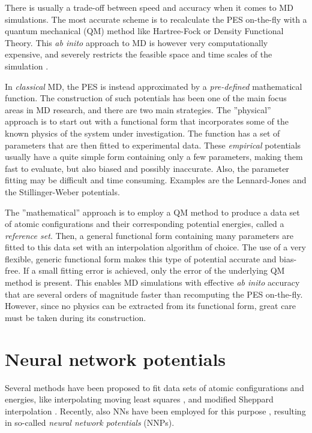\documentclass[twoside,english]{uiofysmaster}
\begin{document}
There is usually a trade-off between speed and accuracy when it comes to MD simulations. 
The most accurate scheme is to recalculate the PES on-the-fly with a quantum mechanical (QM) method like 
Hartree-Fock or Density Functional Theory. 
This \textit{ab inito} approach to MD is however very computationally expensive, 
and severely restricts the feasible space and time scales of the simulation \cite{Sherrill10}.   

In \textit{classical} MD, the PES is instead approximated by a \textit{pre-defined} mathematical function. 
The construction of such potentials has been one of the main focus areas in MD research, and there 
are two main strategies. The ''physical'' approach is to start out with a functional form 
that incorporates some of the known physics of the system under investigation. 
The function has a set of parameters that are then fitted to experimental data. 
These \textit{empirical} potentials usually have a quite simple form containing only 
a few parameters, making them fast to evaluate, but also biased and possibly inaccurate. Also, the parameter fitting 
may be difficult and time consuming. Examples are the Lennard-Jones \cite{Jones24} and the Stillinger-Weber 
\cite{Stillinger85} potentials. 

The ''mathematical'' approach is to employ a QM method to produce a data set of atomic configurations and 
their corresponding potential energies, called a \textit{reference set}. 
Then, a general functional form containing many parameters are fitted to this data set with 
an interpolation algorithm of choice. The use of a very flexible, generic functional form makes this type of potential 
accurate and bias-free. If a small fitting error is achieved, only the error of the underlying QM method 
is present. This enables MD simulations with effective \textit{ab inito} accuracy that are several orders of magnitude
faster than recomputing the PES on-the-fly. However, since no physics can be extracted from its functional form, great 
care must be taken during its construction. 


\section{Neural network potentials}
Several methods have been proposed to fit data sets of atomic configurations and energies, 
like interpolating moving least squares \cite{Dawes08}, 
and modified Sheppard interpolation \cite{Ischtwan94}. Recently, also NNs have been employed for this purpose
\cite{Behler11general}, resulting in so-called \textit{neural network potentials} (NNPs). 
\end{document}
